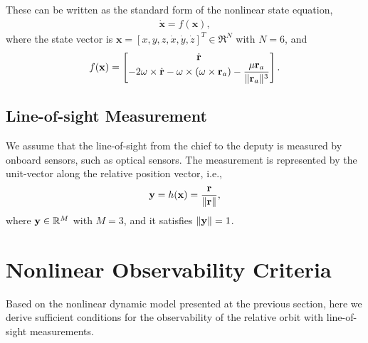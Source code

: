 These can be written as the standard form of the nonlinear state equation,
\begin{align}
\dot{\mathbf{x}} = f (\mathbf{x}), \label{eqn:xxdot}
\end{align}
where the state vector is $\mathbf{x}=[x,y,z,\dot x, \dot y,\dot z]^T\in\Re^N$ with $N=6$, and
\begin{align}
f(\mathbf{x}) 
=\begin{bmatrix}
\dot {\mathbf{r}} \\
-2\omega\times \dot{\mathbf{r}} - \omega\times(\omega\times \mathbf{r}_a) -\dfrac{\mu \mathbf{r}_a}{\|\mathbf{r}_a\|^3}
\end{bmatrix}.\label{eqn:f}
\end{align}

\subsection{Line-of-sight Measurement}

We assume that the line-of-sight from the chief to the deputy is measured by onboard sensors, such as optical sensors. The measurement is represented by the unit-vector along the relative position vector, i.e.,
\begin{align}
\mathbf{y} = h(\mathbf{x}) =\frac{\mathbf{r}}{\|\mathbf{r}\|},\label{eqn:y}
\end{align}
where $\mathbf{y}\in\mathbb{R}^M$ with $M=3$, and it satisfies $\|\mathbf{y}\|=1$.

\section{Nonlinear Observability Criteria}\label{sec:OC}

Based on the nonlinear dynamic model presented at the previous section, here we derive sufficient conditions for the observability of the relative orbit with line-of-sight measurements.



